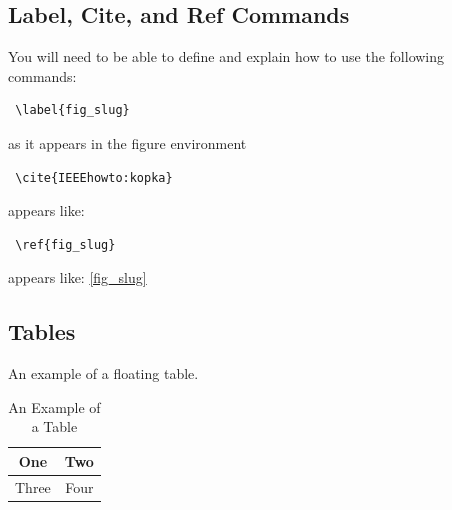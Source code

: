\documentclass[12pt,journal,compsoc]{IEEEtran}
\begin{document}

\subsection{Label, Cite, and Ref Commands}
You will need to be able to define and explain how to use the following commands:
\begin{verbatim} \label{fig_slug} \end{verbatim} as it appears in the figure environment\\
\begin{verbatim} \cite{IEEEhowto:kopka} \end{verbatim} appears like: \cite{IEEEhowto:kopka}\\
\begin{verbatim} \ref{fig_slug} \end{verbatim} appears like: \ref{fig_slug}\\


\subsection{Tables}
An example of a floating table.

%
\begin{table}[h]
\renewcommand{\arraystretch}{1.3}
\caption{An Example of a Table}
\label{table_example}
\centering
\begin{tabular}{|c||c|}
\hline
One & Two\\
\hline
Three & Four\\
\hline
\end{tabular}
\end{table}
\end{document}
